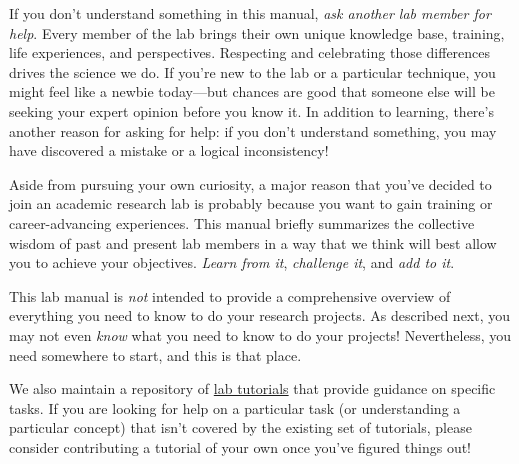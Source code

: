 \documentclass{tufte-book} %
\begin{document}
\noindent If you don't understand something in
this manual, \textit{ask another lab
  member for help}.  Every member of the lab brings their own unique
knowledge base, training, life experiences, and perspectives.
Respecting and celebrating those differences drives the science we do.
If you're new to the lab or a particular technique, you might
feel like a newbie today---but chances are good that someone else will be seeking your expert opinion
before you know it.  In addition to learning, there's another reason for asking for help: if you don't understand something, you may have discovered a mistake or a logical
inconsistency!



Aside from pursuing your own curiosity, a major reason that you've
decided to join an academic research lab is probably because you want
to gain training or career-advancing experiences.  This manual briefly
summarizes the collective wisdom of past and present lab members in a
way that we think will best allow you to achieve your objectives.
\textit{Learn from it}, \textit{challenge it}, and \textit{add to it}.


\noindent This lab manual is \textit{not} intended to provide a
comprehensive overview of everything you need to know to do your
research projects.  As described next, you may not even \textit{know}
what you need to know to do your projects!  Nevertheless, you need
somewhere to start, and this is that place.

We also maintain a repository of
\href{https://github.com/ContextLab/CDL-tutorials}{lab tutorials} that
provide guidance on specific tasks.  If you are looking for help on a
particular task (or understanding a particular concept) that isn't
covered by the existing set of tutorials, please consider contributing
a tutorial of your own once you've figured things out!
\end{document}
